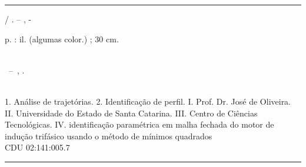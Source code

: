 
%

\begin{fichacatalografica}
	\vspace*{\fill}					%
	\hrule							%
	\begin{center}					%
	\begin{minipage}[c]{12.5cm}		%
	
	\imprimirautor
	
	\hspace{0.5cm} \imprimirtitulo  / \imprimirautor. --
	\imprimirlocal, \imprimirdata-
	
	\hspace{0.5cm} \pageref{LastPage} p. : il. (algumas color.) ; 30 cm.\\
	
	\hspace{0.5cm} \imprimirorientadorRotulo~\imprimirorientador\\
	
	\hspace{0.5cm}
	\parbox[t]{\textwidth}{\imprimirtipotrabalho~--~\imprimirinstituicao,
	\imprimirdata.}\\
	
	\hspace{0.5cm}
		1. Análise de trajetórias.
		2. Identificação de perfil.
		I. Prof. Dr. José de Oliveira.
		II. Universidade do Estado de Santa Catarina.
		III. Centro de Ciências Tecnológicas.
		IV. identificação paramétrica em malha fechada do motor de indução trifásico usando o método de mínimos quadrados\\ 			
	
	\hspace{8.75cm} CDU 02:141:005.7\\
	
	\end{minipage}
	\end{center}
	\hrule
\end{fichacatalografica}